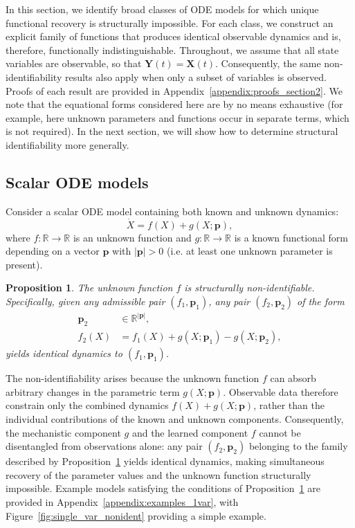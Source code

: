 \documentclass{article}
\theoremstyle{plain}
\newtheorem{proposition}{Proposition}[section]
\theoremstyle{definition}
\renewcommand{\vec}[1]{\boldsymbol{#1}}
\begin{document}
In this section, we identify broad classes of ODE models for which unique functional recovery is structurally impossible. For each class, we construct an explicit family of functions that produces identical observable dynamics and is, therefore, functionally indistinguishable. Throughout, we assume that all state variables are observable, so that $\vec{Y}(t)=\vec{X}(t)$. Consequently, the same non-identifiability results also apply when only a subset of variables is observed. Proofs of each result are provided in Appendix~\ref{appendix:proofs_section2}. We note that the equational forms considered here are by no means exhaustive (for example, here unknown parameters and functions occur in separate terms, which is not required). In the next section, we will show how to determine structural identifiability more generally.


\subsection{Scalar ODE models} \label{sec:nonident_1var_UDEs}

Consider a scalar ODE model containing both known and unknown dynamics:
\begin{equation} \label{eq:nonident_1var_UDEs}
    \dot{X} = f(X) + g(X;\vec{p}),
\end{equation}
where $f:\mathbb{R}\to\mathbb{R}$ is an unknown function and $g:\mathbb{R}\to\mathbb{R}$ is a known functional form depending on a vector $\vec{p}$ with $|\vec{p}|>0$ (i.e. at least one unknown parameter is present).

\begin{proposition} \label{prop:1var_nonident}
The unknown function $f$ is structurally non-identifiable. Specifically, given any admissible pair $(f_1, \vec{p}_1)$, any pair $(f_2, \vec{p}_2)$ of the form
\begin{align}    
    \vec{p}_2 &\in \mathbb{R}^{|\vec{p}|}, \\
    f_2(X) &= f_1(X) + g(X;\vec{p}_1) - g(X;\vec{p}_2), \label{eq:1var_nonident_expr}
\end{align}
yields identical dynamics to $(f_1, \vec{p}_1)$. 
\end{proposition}

The non-identifiability arises because the unknown function $f$ can absorb arbitrary changes in the parametric term $g(X;\vec{p})$. Observable data therefore constrain only the combined dynamics $f(X)+g(X;\vec{p})$, rather than the individual contributions of the known and unknown components. Consequently, the mechanistic component $g$ and the learned component $f$ cannot be disentangled from observations alone: any pair $(f_2,\vec{p}_2)$ belonging to the family described by Proposition~\ref{prop:1var_nonident} yields identical dynamics, making simultaneous recovery of the parameter values and the unknown function structurally impossible. Example models satisfying the conditions of Proposition~\ref{prop:1var_nonident} are provided in Appendix~\ref{appendix:examples_1var}, with Figure~\ref{fig:single_var_nonident} providing a simple example.
\end{document}
